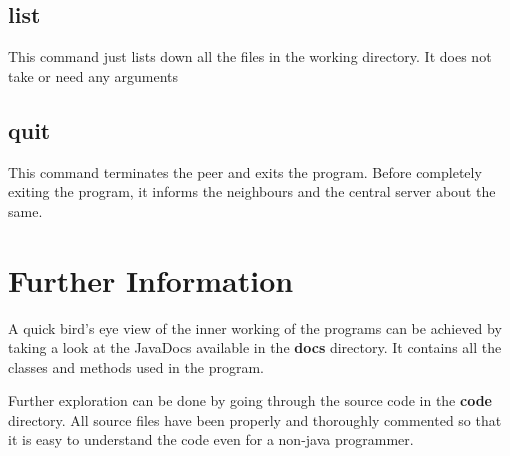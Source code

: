 \documentclass[12pt,twosided,a4paper]{article}
\numberwithin{equation}{section} %
\numberwithin{figure}{section} %
\numberwithin{table}{section} %
\begin{document}
\subsection{list}
This command just lists down all the files in the working directory. It does not
take or need any arguments

\subsection{quit}
This command terminates the peer and exits the program. Before completely
exiting the program, it informs the neighbours and the central server about the
same.
\section{Further Information}
A quick bird's eye view of the inner working of the programs can be achieved by
taking a look at the JavaDocs available in the \textbf{docs} directory. It contains all the classes
and methods used in the program.

Further exploration can be done by going through the source code in the
\textbf{code} directory. All source files have been properly and thoroughly
commented so that it is easy to understand the code even for a non-java
programmer.
\end{document}
